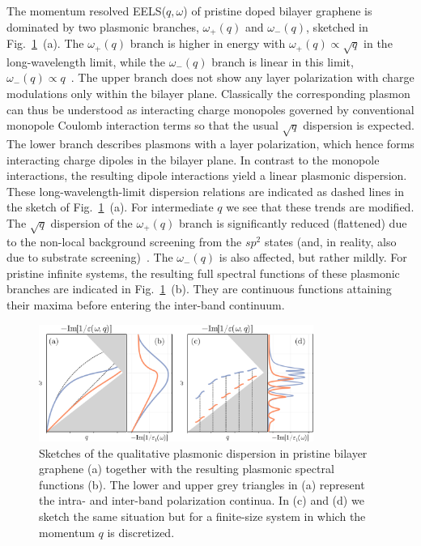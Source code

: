 The momentum resolved EELS($q, \omega$) of pristine doped bilayer graphene is dominated by two plasmonic branches, $\omega_+(q)$ and $\omega_-(q)$, sketched in Fig.~\ref{fig:mat22:BLGDispersion}~(a). The $\omega_+(q)$ branch is higher in energy with $\omega_+(q) \propto \sqrt{q}$ in the long-wavelength limit, while the $\omega_-(q)$ branch is linear in this limit, $\omega_-(q) \propto q$~\cite{hwang_dielectric_2007,hwang_plasmon_2009,roldan_dielectric_2013}. The upper branch does not show any layer polarization with charge modulations only within the bilayer plane. Classically the corresponding plasmon can thus be understood as interacting charge monopoles governed by conventional monopole Coulomb interaction terms so that the usual $\sqrt{q}$ dispersion is expected. The lower branch describes plasmons with a layer polarization, which hence forms interacting charge dipoles in the bilayer plane. In contrast to the monopole interactions, the resulting dipole interactions yield a linear plasmonic dispersion. These long-wavelength-limit dispersion relations are indicated as dashed lines in the sketch of Fig.~\ref{fig:mat22:BLGDispersion}~(a). For intermediate $q$ we see that these trends are modified. The $\sqrt{q}$ dispersion of the $\omega_+(q)$ branch is significantly reduced (flattened) due to the non-local background screening from the $sp^2$ states (and, in reality, also due to substrate screening)~\cite{da_jornada_universal_2020,jiang_plasmonic_2021}. The $\omega_-(q)$ is also affected, but rather mildly. For pristine infinite systems, the resulting full spectral functions of these plasmonic branches are indicated in Fig.~\ref{fig:mat22:BLGDispersion}~(b). They are continuous functions attaining their maxima before entering the inter-band continuum.
        
\begin{figure}
    \centering
    \includegraphics[width=0.8\textwidth]{handmade/Figure_4.pdf}
    \caption{Sketches of the qualitative plasmonic dispersion in pristine bilayer graphene (a) together with the resulting plasmonic spectral functions (b). The lower and upper grey triangles in (a) represent the intra- and inter-band polarization continua. In (c) and (d) we sketch the same situation but for a finite-size system in which the momentum $q$ is discretized. \label{fig:mat22:BLGDispersion}}
\end{figure}

